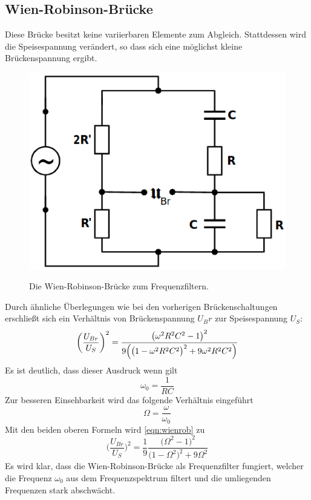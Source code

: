 \documentclass[titlepage = firstcover]{scrartcl}
\begin{document}
        \subsection{Wien-Robinson-Brücke}
          Diese Brücke besitzt keine variierbaren Elemente zum Abgleich. Stattdessen wird die Speisespannung verändert, so dass sich eine möglichst
          kleine Brückenspannung ergibt.
          \begin{figure}[h]
            \centering
            \caption{Die Wien-Robinson-Brücke zum Frequenzfiltern.}
            \includegraphics[width = 0.4\linewidth]{Wien_Robinson.png}
            \label{fig:wienrobinsonbr}
          \end{figure}
          \FloatBarrier
          \noindent
          Durch ähnliche Überlegungen wie bei den vorherigen Brückenschaltungen erschließt sich ein Verhältnis von Brückenspannung $U_Br$ zur
          Speisespannung $U_S$:
          \begin{equation}
            \label{eqn:wienrob}
            \biggl(\frac{U_{Br}}{U_S} \biggr)^2 = \frac{\bigl(\omega^2 R^2 C^2 - 1 \bigr)^2}{9\Bigl(\bigl(1 - \omega^2 R^2 C^2 \bigr)^2 + 9 \omega^2 R^2 C^2 \Bigr)}
          \end{equation}
          Es ist deutlich, dass dieser Ausdruck wenn gilt
          \begin{equation*}
            \omega_0 = \frac{1}{R C}
          \end{equation*}
          Zur besseren Einsehbarkeit wird das folgende Verhältnis eingeführt
          \begin{equation*}
            \Omega = \frac{\omega}{\omega_0}
          \end{equation*}
          Mit den beiden oberen Formeln wird \eqref{eqn:wienrob} zu
          \begin{equation}
            \label{eqn:wienrob}
            \biggl(\frac{U_{Br}}{U_S} \biggr)^2 = \frac{1}{9} \frac{\bigl(\Omega^2 - 1 \bigr)^2}{\bigl(1 - \Omega^2 \bigr)^2 + 9 \Omega^2}
          \end{equation}
          Es wird klar, dass die Wien-Robinson-Brücke als Frequenzfilter fungiert, welcher die Frequenz $\omega_0$ aus dem Frequenzspektrum filtert und
          die umliegenden Frequenzen stark abschwächt.
\end{document}
